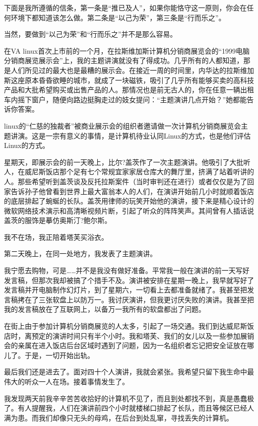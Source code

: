 下面是我所遵循的信条，第一条是“推已及人”，如果你能恪守这一原则，你会在任何环境下都知道该怎么做。第二条是“以己为荣”，第三条是“行而乐之”。

当然，要做到“以己为荣”和“行而乐之”并不是那么容易。

在VA linux首次上市前的一个月，在拉斯维加斯计算机分销商展览会的“1999电脑分销商展览展示会”上，我的主题讲演就没有了得成功。几乎所有的人都知道，那是人们所见过的最大也是最糟的展示会。在接近一周的时间里，内华达的拉斯维加斯这座原本昏昏欲睡的城市，就成了一块磁铁，吸引了几乎所有能够买卖的高科技产品和大批希望购买或出售产品的人。那情况也是前无古人的，你在任意一辆出租车内摇下窗户，随便向路边挺胸走过的妓女提问：“主题演讲几点开始？”她都能告诉你答案。

linux的“仁慈的独裁者”被商业展示会的组织者邀请做一次计算机分销商展览会主题讲演。这是一宗有意义的事情，是计算机待业认同Linux的方式，也是他们评估Linux的方式。

星期天，即展示会的前一天晚上，比尔?盖茨作了一次主题演讲。他吸引了大批听人，在威尼斯饭店那个足有七个常规宜家家居仓库大的舞厅里，挤满了站着听讲的人。那些希望听到盖茨谈及反托拉斯案件（当时审判还在进行）或者仅仅是为了回家告诉孙子他曾看到世界上最大富翁本人的人们，在演讲开始前几小时就顺着饭店的底层排起了蜿蜒的长队。盖茨用律师的玩笑开始他的演讲，接下来是精心设计的微软网络技术演示和高清晰视频片断，引起了听众的阵阵笑声。其间曾有人插话说盖茨的服饰是摹仿奥斯汀?鲍尔斯。

我不在场，我正陪着塔芙买浴衣。

第二天晚上，在同一处地方，我发表了主题演讲。

我宁愿去购物，可是……并不是我没有做好准备。平常我一般在演讲的前一天写好发言稿，但那次我却被搞了个措手不及。演讲被安排在星期一晚上，我早就写好了发言稿并开电脑制作幻灯片，到了星期六，一切看上去都准备就绪了。我甚至把发言稿拷在了三张软盘上以防万一。我讨厌演讲，但我更讨厌失败的演讲。我甚至把我的发言稿放在了互联网上，以备万一我所有的软盘都出了问题。

在街上由于参加计算机分销商展览的人太多，引起了一场交通。我们到达威尼斯饭店时，离预定的演讲时间只有半个小时。我和塔芙、我们的女儿以及一些参加展销会的亲属在进入饭店后台区域时遇到了问题，因为一名组织者忘记把安全证放在哪儿了。于是，一切开始出轨。

最后我们还是进去了。面对四十个人演讲，我就会紧张。我希望只留下我生命中最伟大的听众一人在场。接着事情发生了。

我发现两天前我辛辛苦苦收拾好的计算机不见了，而且到处都找不到，真是愚蠢极了。有人提醒我，人们在演讲前四个小时就楼梯口排起了长队，而且等候区已经人满为患。而我们却像只无头的母鸡，在后台到处乱窜，寻找丢失的计算机。

